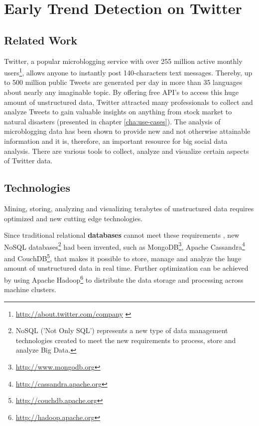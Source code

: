 
\chapter{Early Trend Detection on Twitter}
\label{cha:early-detection}

\section{Related Work}
\label{sec:related-work}
Twitter, a popular microblogging service with over 255 million active monthly users\footnote{\url{http://about.twitter.com/company} \accessednote \label{aboutwitter}}, allows anyone to instantly post 140-characters text messages. Thereby, up to 500 million public Tweets are generated per day in more than 35 languages about nearly any imaginable topic. By offering free API’s to access this huge amount of unstructured data, Twitter attracted many professionals to collect and analyze Tweets to gain valuable insights on anything from stock market to natural disasters (presented in chapter \ref{cha:use-cases}). The analysis of microblogging data has been shown to provide new and not otherwise attainable information and it is, therefore, an important resource for big social data analysis. There are various tools to collect, analyze and visualize certain aspects of Twitter data.


\section{Technologies}
\label{sec:technologies}
Mining, storing, analyzing and visualizing terabytes of unstructured data requires optimized and new cutting edge technologies. 

Since traditional relational \textbf{databases} cannot meet these requirements \cite{TwitterDataAnalytics2013}, new NoSQL databases\footnote{NoSQL ('Not Only SQL') represents a new type of data management technologies created to meet the new requirements to process, store and analyze Big Data.} had been invented, such as MongoDB\footnote{\url{http://www.mongodb.org} \accessednote }, Apache Cassandra\footnote{\url{http://cassandra.apache.org} \accessednote} and CouchDB\footnote{\url{http://couchdb.apache.org} \accessednote}, that makes it possible to store, manage and analyze the huge amount of unstructured data in real time. Further optimization can be achieved by using Apache Hadoop\footnote{\url{http://hadoop.apache.org} \accessednote} to distribute the data storage and processing across machine clusters.

